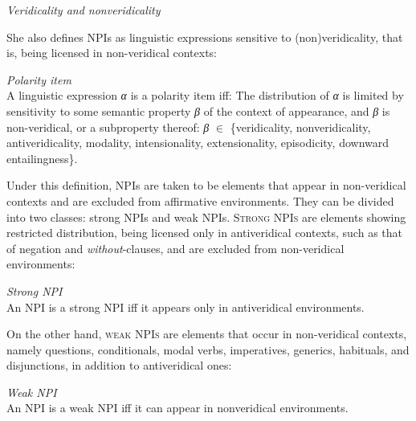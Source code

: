 \documentclass[output=paper]{langscibook}
\begin{document}
\ea\label{gia:ex4}
\textit{Veridicality and nonveridicality} \citep[33]{giannaki2002licensing}
\z
\z

\noindent She also defines NPIs as linguistic expressions sensitive to (non)veridicality, that is, being licensed in non-veridical contexts:

\ea\label{gia:ex5} \textit{Polarity item} \citep[669]{giannaki2001free} \\
A linguistic expression \textit{α} is a polarity item iff:
\ea The distribution of \textit{α} is limited by sensitivity to some semantic property \textit{β} of the context of appearance, and
\ex \textit{β} is non-veridical, or a subproperty thereof: \textit{β} $\in$ \{veridicality, nonveridicality, antiveridicality, modality, intensionality, extensionality, episodicity, downward entailingness\}.
\z\z

\noindent Under this definition, NPIs are taken to be elements that appear in non-veridical contexts and are excluded from affirmative environments. They can be divided into two classes: strong NPIs and weak NPIs. \textsc{Strong NPIs} are elements showing restricted distribution, being licensed only in antiveridical contexts, such as that of negation and \textit{without}-clauses, and are excluded from non-veridical environments:

\begin{exe}
\ex\label{gia:ex6}
\textit{Strong NPI}\\
An NPI is a strong NPI iff it appears only in antiveridical environments.
\end{exe}

\noindent On the other hand, \textsc{weak NPIs} are elements that occur in non-veridical contexts, namely questions, conditionals, modal verbs, imperatives, generics, habituals, and disjunctions, in addition to antiveridical ones:

\begin{exe}
\ex\label{gia:ex7}
\textit{Weak NPI}\\
An NPI is a weak NPI iff it can appear in nonveridical environments.
\end{exe}
\end{document}
